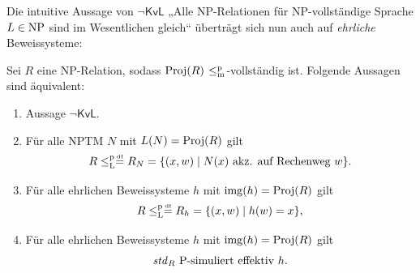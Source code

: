 Die intuitive Aussage von $\neg\mathsf{KvL}$ „Alle NP-Relationen für NP-vollständige Sprache $L\in\NP$ sind im Wesentlichen gleich“ überträgt sich nun auch auf \emph{ehrliche} Beweissysteme:
\begin{theorem}\label{thm:kvl-ps}
    Sei $R$ eine NP-Relation, sodass $\Proj(R)$ $\leqmp$-vollständig ist.
    Folgende Aussagen sind äquivalent:
    \begin{enumerate}
        \item Aussage $\neg\mathsf{KvL}$.
        \item Für alle NPTM $N$ mit $L(N)=\Proj(R)$ gilt
            \[ R \leqlp \defeq R_N = \{ (x, w) \mid  \text{$N(x)$ akz. auf Rechenweg $w$}\}. \]
        \item Für alle ehrlichen Beweissysteme $h$ mit $\img(h)=\Proj(R)$ gilt
\[ R \leqlp \defeq R_{h} = \{ (x, w) \mid  \text{$h(w)=x$}\}, \]
        \item Für alle ehrlichen Beweissysteme $h$ mit $\img(h)=\Proj(R)$ gilt
    \[  \text{$\mathit{std}_R$ $\P$-simuliert effektiv $h$}. \]
    \end{enumerate}
\end{theorem}
